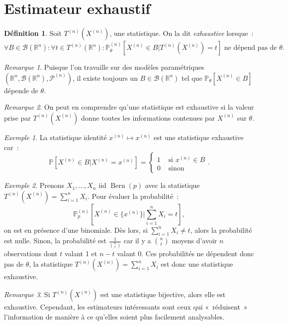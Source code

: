 \documentclass{report}
\DeclareMathOperator{\Bern}{Bern}  %
\renewcommand{\P}{\mathbb P}
\newcommand{\statmod}[4]{\left(#1^{#4}, #2\left(#1^{#4}\right), #3^{\left(#4\right)}\right)}
\newcommand{\R}{\mathbb R}
\newcommand{\Brl}{\mathcal B}  %
\theoremstyle{definition}
\newtheorem{déf}[thm]{Définition}
\theoremstyle{remark}
\newtheorem*{rmq}{Remarque}
\newtheorem{ex}{Exemple}[chapter]
\begin{document}
	\section{Estimateur exhaustif}
		\begin{déf} Soit $T^{(n)}(X^{(n)})$, une statistique. On la dit \textit{exhaustive} lorsque~:
		\[\forall B \in \Brl(\R^n) : \forall t \in T^{(n)}(\R^n) : \P_\theta^{(n)}\left[X^{(n)} \in B | T^{(n)}(X^{(n)}) = t\right] \text{ ne dépend pas de } \theta.\]
		\end{déf}

		\begin{rmq} Puisque l'on travaille sur des modèles paramétriques $\statmod \R\Brl{\mathcal P}n$, il existe toujours un $B \in \Brl(\R^n)$ tel que
		$\P_\theta[X^{(n)} \in B]$ dépende de $\theta$.
		\end{rmq}

		\begin{rmq} On peut en comprendre qu'une statistique est exhaustive si la valeur prise par $T^{(n)}(X^{(n)})$ donne toutes les informations contenues par
		$X^{(n)}$ sur $\theta$.
		\end{rmq}

		\begin{ex} La statistique identité $x^{(n)} \mapsto x^{(n)}$ est une statistique exhaustive car~:
		\[\P\left[X^{(n)} \in B | X^{(n)} = x^{(n)}\right] =  \begin{cases}1 &\text{ si } x^{(n)} \in B \\0 &\text{ sinon}\end{cases}.\]
		\end{ex}

		\begin{ex} Prenons $X_1, \ldots, X_n$ iid $\Bern(p)$ avec la statistique $T^{(n)}(X^{(n)}) = \sum_{i=1}^nX_i$. Pour évaluer la probabilité~:
		\[\P_p^{(n)}\left[X^{(n)} \in \{x^{(n)}\} | \sum_{i=1}^nX_i = t\right],\]
		on est en présence d'une binomiale. Dès lors, si $\sum_{i=1}^nX_i \neq t$, alors la probabilité est nulle. Sinon, la probabilité est $\frac 1{\binom nt}$ car
		il y a $\binom nt$ moyens d'avoir $n$ observations dont $t$ valant 1 et $n-t$ valant 0. Ces probabilités ne dépendent donc pas de $\theta$, la statistique
		$T^{(n)}(X^{(n)}) = \sum_{i=1}^nX_i$ est donc une statistique exhaustive.
		\end{ex}

		\begin{rmq} Si $T^{(n)}(X^{(n)})$ est une statistique bijective, alors elle est exhaustive. Cependant, les estimateurs intéressants sont ceux qui «~réduisent~»
		l'information de manière à ce qu'elles soient plus facilement analysables.
		\end{rmq}
\end{document}
